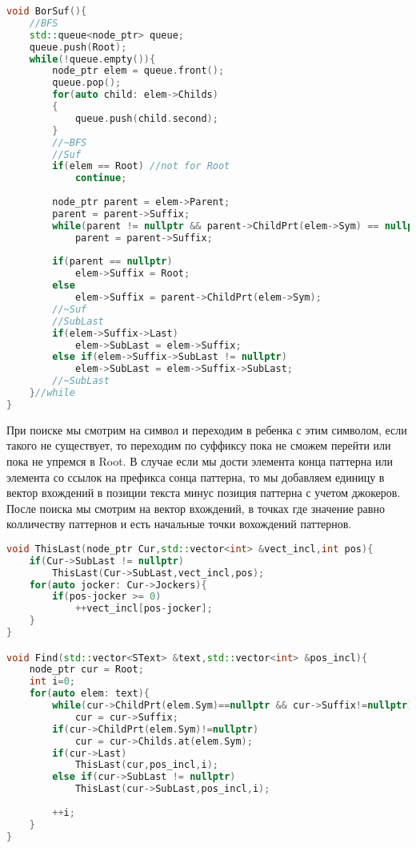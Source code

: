 \begin{lstlisting}[language=C++]
void BorSuf(){
    //BFS
    std::queue<node_ptr> queue;
    queue.push(Root);
    while(!queue.empty()){
        node_ptr elem = queue.front();
        queue.pop();
        for(auto child: elem->Childs)
        {
            queue.push(child.second);
        }
        //~BFS
        //Suf
        if(elem == Root) //not for Root
		    continue;
        
        node_ptr parent = elem->Parent;
        parent = parent->Suffix;
        while(parent != nullptr && parent->ChildPrt(elem->Sym) == nullptr)
            parent = parent->Suffix;
        
        if(parent == nullptr)
            elem->Suffix = Root;
        else
            elem->Suffix = parent->ChildPrt(elem->Sym);
        //~Suf
        //SubLast
        if(elem->Suffix->Last)
            elem->SubLast = elem->Suffix;
        else if(elem->Suffix->SubLast != nullptr)
            elem->SubLast = elem->Suffix->SubLast;
        //~SubLast
    }//while
}
\end{lstlisting}

При поиске мы смотрим на символ и переходим в ребенка с этим символом, если такого не существует, то переходим по суффиксу пока не сможем перейти или пока не упремся в Root. В случае если мы дости элемента конца паттерна или элемента со ссылок на префикса сонца паттерна, то мы добавляем единицу в вектор вхождений в позиции текста минус позиция паттерна с учетом джокеров. После поиска мы смотрим на вектор вхождений, в точках где значение равно колличеству паттернов и есть начальные точки вохождений паттернов.

\begin{lstlisting}[language=C++]
void ThisLast(node_ptr Cur,std::vector<int> &vect_incl,int pos){
    if(Cur->SubLast != nullptr)
        ThisLast(Cur->SubLast,vect_incl,pos);
    for(auto jocker: Cur->Jockers){ 
        if(pos-jocker >= 0)
            ++vect_incl[pos-jocker];
    }
}

void Find(std::vector<SText> &text,std::vector<int> &pos_incl){
    node_ptr cur = Root;
    int i=0;
    for(auto elem: text){
        while(cur->ChildPrt(elem.Sym)==nullptr && cur->Suffix!=nullptr)
            cur = cur->Suffix;
        if(cur->ChildPrt(elem.Sym)!=nullptr)
            cur = cur->Childs.at(elem.Sym);
        if(cur->Last)
            ThisLast(cur,pos_incl,i);
        else if(cur->SubLast != nullptr)
            ThisLast(cur->SubLast,pos_incl,i);
        
        ++i;
    }
}
\end{lstlisting}

